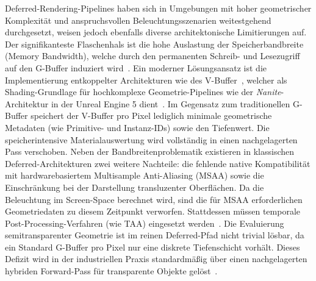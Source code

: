 Deferred-Rendering-Pipelines haben sich in Umgebungen mit hoher geometrischer Komplexität und anspruchsvollen
Beleuchtungsszenarien weitestgehend durchgesetzt, weisen jedoch ebenfalls diverse architektonische Limitierungen
auf.
Der signifikanteste Flaschenhals ist die hohe Auslastung der Speicherbandbreite (Memory Bandwidth), welche durch den
permanenten Schreib- und Lesezugriff auf den \ac{G-Buffer} induziert
wird~\cite[S.~55]{burnsVisibilityBufferCacheFriendly2013}.
Ein moderner Lösungsansatz ist die Implementierung entkoppelter Architekturen wie des
\ac{V-Buffer}~\parencite{burnsVisibilityBufferCacheFriendly2013}, welcher als Shading-Grundlage für hochkomplexe
Geometrie-Pipelines wie der \textit{Nanite}-Architektur in der Unreal Engine 5
dient~\cite[Folie~\textit{Visibility Buffer}]{Karis_Nanite_SIGGRAPH_Advances_2021_final}.
Im Gegensatz zum traditionellen \ac{G-Buffer} speichert der V-Buffer pro Pixel lediglich minimale geometrische Metadaten
(wie Primitive- und Instanz-IDs) sowie den Tiefenwert.
Die speicherintensive Materialauswertung wird vollständig in einen nachgelagerten Pass verschoben.
Neben der Bandbreitenproblematik existieren in klassischen Deferred-Architekturen zwei weitere Nachteile: die fehlende
native Kompatibilität mit hardwarebasiertem Multisample Anti-Aliasing (\ac{MSAA}) sowie die Einschränkung bei der Darstellung
transluzenter Oberflächen.
Da die Beleuchtung im Screen-Space berechnet wird, sind die für \ac{MSAA} erforderlichen Geometriedaten zu diesem Zeitpunkt
verworfen.
Stattdessen müssen temporale Post-Processing-Verfahren (wie \ac{TAA}) eingesetzt
werden~\cite[S.~5]{Thaler2011DeferredRendering, taaantialiasing}.
Die Evaluierung semitransparenter Geometrie ist im reinen Deferred-Pfad nicht trivial lösbar, da ein Standard
\ac{G-Buffer} pro Pixel nur eine diskrete Tiefenschicht vorhält.
Dieses Defizit wird in der industriellen Praxis standardmäßig über einen nachgelagerten hybriden Forward-Pass für
transparente Objekte gelöst~\cite[S.~56]{burnsVisibilityBufferCacheFriendly2013}.

